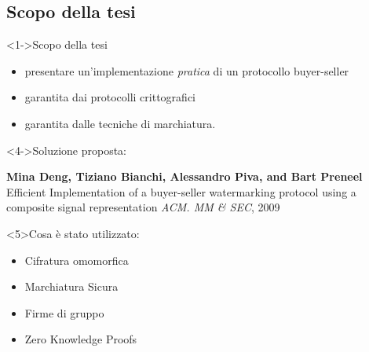 \subsection{Scopo della tesi}
\begin{frame}
	\begin{block}<1->{Scopo della tesi}
\begin{itemize}	
 \item<1-> presentare un'implementazione \textit{pratica} di un protocollo buyer-seller
 \item<2-> garantita dai protocolli crittografici
 \item<3->  garantita dalle tecniche di marchiatura.
\end{itemize}	
	\end{block}
	\begin{block}<4->{Soluzione proposta:}
	   \begin{overprint} 
	   		\begin{thebibliography}{XX}
   			 \textbf{Mina Deng, Tiziano Bianchi, Alessandro Piva, and Bart Preneel}
  			 \newblock Efficient Implementation of a buyer-seller watermarking protocol using a composite signal 									representation
   				\newblock \emph{ACM. MM \& SEC}, 2009
			\end{thebibliography}
	   \end{overprint}
	\end{block}	
\begin{block}<5>{Cosa è stato utilizzato:}
\begin{itemize}
\item Cifratura omomorfica
\item Marchiatura Sicura
\item Firme di gruppo
\item Zero Knowledge Proofs
\end{itemize}
\end{block}
\end{frame}

